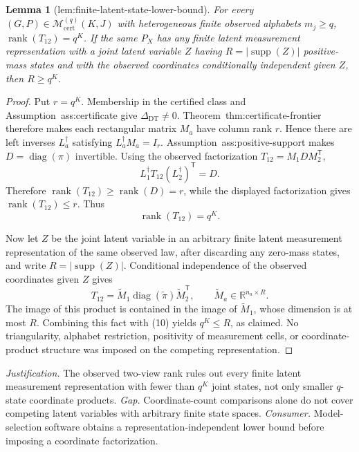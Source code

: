 \documentclass{article}
\newtheorem{lemma}{Lemma}
\begin{document}
\begin{lemma}[lem:finite-latent-state-lower-bound]\label{lem:finite-latent-state-lower-bound}
For every \((G,P)\in\mathcal M_{\mathrm{cert}}^{(q)}(K,J)\) with heterogeneous finite observed alphabets \(m_j\ge q\), \(\operatorname{rank}(T_{12})=q^K\).  If the same \(P_X\) has any finite latent measurement representation with a joint latent variable \(Z\) having \(R=|\operatorname{supp}(Z)|\) positive-mass states and with the observed coordinates conditionally independent given \(Z\), then \(R\ge q^K\).
\end{lemma}
\begin{proof}
Put \(r=q^K\).  Membership in the certified class and Assumption~\textnormal{ass:certificate} give \(\Delta_{\mathrm{DT}}\neq0\).  Theorem~\textnormal{thm:certificate-frontier} therefore makes each rectangular matrix \(M_a\) have column rank \(r\).  Hence there are left inverses \(L_a^{\dagger}\) satisfying \(L_a^{\dagger}M_a=I_r\).  Assumption~\textnormal{ass:positive-support} makes \(D=\operatorname{diag}(\pi)\) invertible.  Using the observed factorization \(T_{12}=M_1DM_2^{\mathsf T}\),
\[
 L_1^{\dagger}T_{12}(L_2^{\dagger})^{\mathsf T}=D.
\]
Therefore \(\operatorname{rank}(T_{12})\ge\operatorname{rank}(D)=r\), while the displayed factorization gives \(\operatorname{rank}(T_{12})\le r\).  Thus
\[
 \operatorname{rank}(T_{12})=q^K.
\tag{10}
\]

Now let \(Z\) be the joint latent variable in an arbitrary finite latent measurement representation of the same observed law, after discarding any zero-mass states, and write \(R=|\operatorname{supp}(Z)|\).  Conditional independence of the observed coordinates given \(Z\) gives
\[
 T_{12}=\widetilde M_1\operatorname{diag}(\widetilde\pi)
 \widetilde M_2^{\mathsf T},
 \qquad
 \widetilde M_a\in\mathbb R^{n_a\times R}.
\]
The image of this product is contained in the image of \(\widetilde M_1\), whose dimension is at most \(R\).  Combining this fact with (10) yields \(q^K\le R\), as claimed.  No triangularity, alphabet restriction, positivity of measurement cells, or coordinate-product structure was imposed on the competing representation.
\end{proof}
\par\smallskip\noindent \textit{Justification.} The observed two-view rank rules out every finite latent measurement representation with fewer than \(q^K\) joint states, not only smaller \(q\)-state coordinate products. \textit{Gap.} Coordinate-count comparisons alone do not cover competing latent variables with arbitrary finite state spaces. \textit{Consumer.} Model-selection software obtains a representation-independent lower bound before imposing a coordinate factorization.
\end{document}
